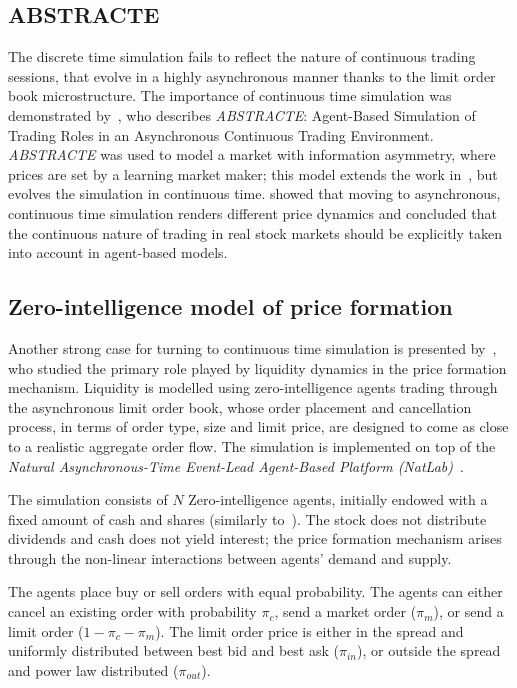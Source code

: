 \subsection{ABSTRACTE}
The discrete time simulation fails to reflect the nature of continuous trading sessions, that evolve in a highly asynchronous manner thanks to the limit order book microstructure. The importance of continuous time simulation was demonstrated by~\citet{Sorban2008}, who describes \textit{ABSTRACTE}: Agent-Based Simulation of Trading Roles in an Asynchronous Continuous Trading Environment. \textit{ABSTRACTE} was used to model a market with information asymmetry, where prices are set by a learning market maker; this model extends the work in~\citep{Das2006}, but evolves the simulation in continuous time. \citet{Sorban2008} showed that moving to asynchronous, continuous time simulation renders different price dynamics and concluded that the continuous nature of trading in real stock markets should be explicitly taken into account in agent-based models.

\subsection{Zero-intelligence model of price formation}
\label{Chapters/Background/Zero-Intelligence-Model}

Another strong case for turning to continuous time simulation is presented by~\citet[chap.~4]{Gilles2006}, who studied the primary role played by liquidity dynamics in the price formation mechanism. Liquidity is modelled using zero-intelligence agents trading through the asynchronous limit order book, whose order placement and cancellation process, in terms of order type, size and limit price, are designed to come as close to a realistic aggregate order flow. The simulation is implemented on top of the \textit{Natural Asynchronous-Time Event-Lead Agent-Based Platform (NatLab)}~\cite[chap.~3]{Gilles2006}.  

The simulation consists of $N$ Zero-intelligence agents, initially endowed with a fixed amount of cash and shares (similarly to~\cite{Raberto2001}). The stock does not distribute dividends and cash does not yield interest; the price formation mechanism arises through the non-linear interactions between agents' demand and supply.

The agents place buy or sell orders with equal probability. The agents can either cancel an existing order with probability $\pi_c$, send a market order ($\pi_m$), or send a limit order ($1-\pi_c-\pi_m$). The limit order price is either in the spread and uniformly distributed between best bid and best ask ($\pi_{in}$), or outside the spread and power law distributed ($\pi_{out}$).

